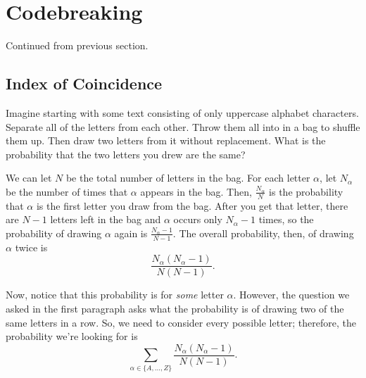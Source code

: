 \documentclass[letterpaper]{article}
\begin{document}
\section{Codebreaking}
Continued from previous section.

\subsection{Index of Coincidence}
Imagine starting with some text consisting of only uppercase alphabet characters. Separate all of the letters from each other. Throw them all into in a bag to shuffle them up. Then draw two letters from it without replacement. What is the probability that the two letters you drew are the same?

\bigskip

We can let $N$ be the total number of letters in the bag. For each letter $\alpha$, let $N_\alpha$ be the number of times that $\alpha$ appears in the bag. Then, $\frac{N_\alpha}{N}$ is the probability that $\alpha$ is the first letter you draw from the bag. After you get that letter, there are $N - 1$ letters left in the bag and $\alpha$ occurs only $N_\alpha - 1$ times, so the probability of drawing $\alpha$ again is $\frac{N_\alpha - 1}{N - 1}$. The overall probability, then, of drawing $\alpha$ twice is \[\frac{N_\alpha (N_\alpha - 1)}{N(N - 1)}.\]

Now, notice that this probability is for \emph{some} letter $\alpha$. However, the question we asked in the first paragraph asks what the probability is of drawing two of the same letters in a row. So, we need to consider every possible letter; therefore, the probability we're looking for is \[\sum_{\alpha \in \{A, \hdots, Z\}} \frac{N_\alpha (N_\alpha - 1)}{N(N - 1)}.\] 
\end{document}
